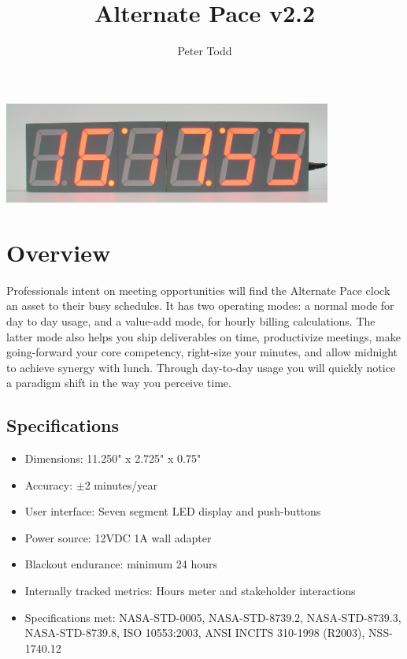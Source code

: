 \documentclass{article}
\makeatletter
\def\s@btitle{\relax}
\def\subtitle#1{\gdef\s@btitle{#1}}
\makeatother
\begin{document}
\title{Alternate Pace v2.2}
\subtitle{286a6cabd5829284}
\author{Peter Todd}
\date{}
\maketitle

\includegraphics[width=4.25in]{figures/front-running-24hr.eps}

\section{Overview}

Professionals intent on meeting opportunities will find the Alternate Pace
clock an asset to their busy schedules. It has two operating modes: a normal
mode for day to day usage, and a value-add mode, for hourly billing
calculations. The latter mode also helps you ship deliverables on time,
productivize meetings, make going-forward your core competency, right-size your
minutes, and allow midnight to achieve synergy with lunch. Through day-to-day
usage you will quickly notice a paradigm shift in the way you perceive time.

\subsection{Specifications}

\begin{itemize}
	\item Dimensions: 11.250" x 2.725" x 0.75"
	\item Accuracy: ${\pm}$2 minutes/year
	\item User interface: Seven segment LED display and push-buttons
	\item Power source: 12VDC 1A wall adapter
	\item Blackout endurance: minimum 24 hours
	\item Internally tracked metrics: Hours meter and stakeholder interactions
    \item Specifications met: NASA-STD-0005, NASA-STD-8739.2, NASA-STD-8739.3, NASA-STD-8739.8, ISO 10553:2003, ANSI INCITS 310-1998 (R2003), NSS-1740.12
\end{itemize}
\end{document}
